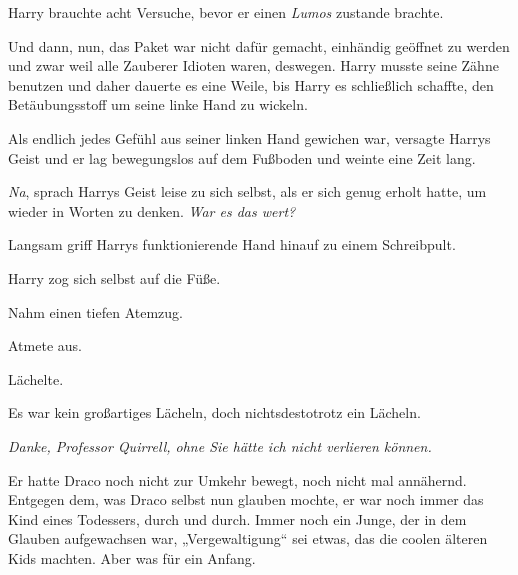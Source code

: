 Harry brauchte acht Versuche, bevor er einen \emph{Lumos} zustande brachte.

Und dann, nun, das Paket war nicht dafür gemacht, einhändig geöffnet zu werden und zwar weil alle Zauberer Idioten waren, deswegen. Harry musste seine Zähne benutzen und daher dauerte es eine Weile, bis Harry es schließlich schaffte, den Betäubungsstoff um seine linke Hand zu wickeln.

Als endlich jedes Gefühl aus seiner linken Hand gewichen war, versagte Harrys Geist und er lag bewegungslos auf dem Fußboden und weinte eine Zeit lang.

\emph{Na}, sprach Harrys Geist leise zu sich selbst, als er sich genug erholt hatte, um wieder in Worten zu denken. \emph{War es das wert?}

Langsam griff Harrys funktionierende Hand hinauf zu einem Schreibpult.

Harry zog sich selbst auf die Füße.

Nahm einen tiefen Atemzug.

Atmete aus.

Lächelte.

Es war kein großartiges Lächeln, doch nichtsdestotrotz ein Lächeln.

\emph{Danke, Professor Quirrell, ohne Sie hätte ich nicht verlieren können.}

Er hatte Draco noch nicht zur Umkehr bewegt, noch nicht mal annähernd. Entgegen dem, was Draco selbst nun glauben mochte, er war noch immer das Kind eines Todessers, durch und durch. Immer noch ein Junge, der in dem Glauben aufgewachsen war, „Vergewaltigung“ sei etwas, das die coolen älteren Kids machten. Aber was für ein Anfang.

